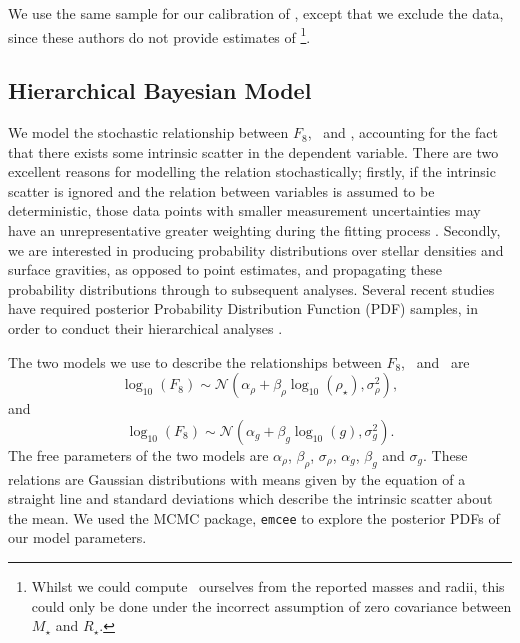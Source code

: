 We use the same sample for our calibration of \logg, except that we exclude the
\citet{Huber2013} data, since these authors do not provide estimates of
\logg\footnote{Whilst we could compute \logg\ ourselves from the reported
masses and radii, this could only be done under the incorrect assumption of
zero covariance between $M_{\star}$ and $R_{\star}$.}.

\subsection{Hierarchical Bayesian Model}

We model the stochastic relationship between $F_8$, \logg\ and \rhostar,
accounting for the fact that there exists some intrinsic scatter in
the dependent variable.
There are two excellent reasons for modelling the relation stochastically;
firstly, if the intrinsic scatter is ignored and the relation between
variables is assumed to be deterministic, those data points with smaller
measurement uncertainties may have an unrepresentative greater weighting
during the fitting process \citep{Hogg2010b}.
Secondly, we are interested in producing probability distributions over
stellar densities and surface gravities, as opposed to point estimates, and
propagating these probability distributions through to subsequent analyses.
Several recent studies have required posterior Probability Distribution
Function (PDF) samples, in order to conduct their hierarchical analyses
\citep[e.g.][]{Foreman-Mackey2014, Rogers2015, Angus2015}.

The two models we use to describe the relationships between $F_8$, \logg\ and
\rhostar\ are
\begin{equation}
	\log_{10}(F_8) \sim \mathcal{N} \left(\alpha_\rho +
    \beta_\rho \log_{10}(\rho_\star), \sigma_\rho^2 \right),
\end{equation}
\label{eq:rho}
and
\begin{equation}
	\log_{10}(F_8) \sim \mathcal{N} \left(\alpha_g + \beta_g
    \log_{10}(g), \sigma_g^2 \right).
\end{equation}
\label{eq:logg}
The free parameters of the two models are $\alpha_\rho$, $\beta_\rho$,
$\sigma_\rho$, $\alpha_g$, $\beta_g$ and $\sigma_g$.
These relations are Gaussian distributions with means given by the equation of
a straight line and standard deviations which describe the intrinsic scatter
about the mean.
We used the MCMC package, {\tt emcee} \citep{Foreman-Mackey2013} to explore the
posterior PDFs of our model parameters.

